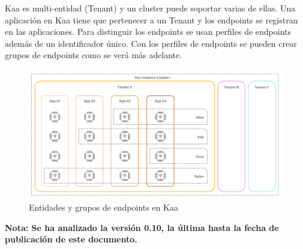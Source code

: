 \documentclass[12pt, twoside]{book}
\begin{document}
Kaa es multi-entidad (Tenant) y un cluster puede soportar varias de ellas. Una aplicación en Kaa tiene que pertenecer a un Tenant y los endpoints se registran en las aplicaciones. Para distinguir los endpoints se usan perfiles de endpoints además de un identificador único. Con los perfiles de endpoints se pueden crear grupos de endpoints como se verá más adelante.
\begin{figure}[H]
\centering
\includegraphics[scale=0.3]{images/tenants}
\caption{Entidades y grupos de endpoints en Kaa}\label{tenant:kaa}
\end{figure}
\textbf{Nota: Se ha analizado la versión 0.10, la última hasta la fecha de publicación de este documento.}
\end{document}
